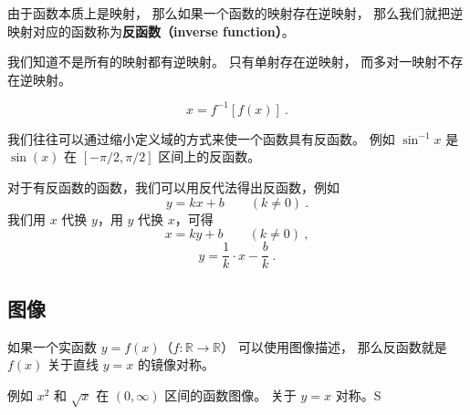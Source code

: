 
\begin{issues}
\issueDraft
\end{issues}

由于函数本质上是映射， 那么如果一个函数的映射存在逆映射， 那么我们就把逆映射对应的函数称为\textbf{反函数（inverse function）}。

我们知道不是所有的映射都有逆映射。 只有单射存在逆映射， 而多对一映射不存在逆映射。

\begin{equation}
x = f^{-1}[f(x)]~.
\end{equation}

我们往往可以通过缩小定义域的方式来使一个函数具有反函数。 例如 $\sin^{-1} x$ 是 $\sin(x)$ 在 $[-\pi/2, \pi/2]$ 区间上的反函数。

对于有反函数的函数，我们可以用反代法得出反函数，例如
\begin{equation}
y = kx + b \qquad (k \ne 0)~.
\end{equation}
我们用 $x$ 代换 $y$，用 $y$ 代换 $x$，可得
\begin{equation}
x = ky + b \qquad (k \ne 0)~,
\end{equation}
\begin{equation}
y = \frac{1}{k} \cdot x - \frac{b}{k}~.
\end{equation}

\subsection{图像}
如果一个实函数 $y = f(x)$（$f: \mathbb R \to \mathbb R$） 可以使用图像描述， 那么反函数就是 $f(x)$ 关于直线 $y = x$ 的镜像对称。

例如 $x^2$ 和 $\sqrt{x}$ 在 $(0, \infty)$ 区间的函数图像。 关于 $y = x$ 对称。S